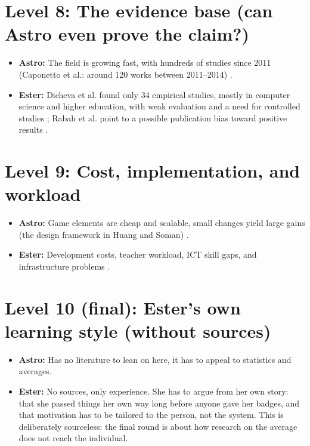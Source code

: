 \documentclass{article}
\begin{document}
\section{Level 8: The evidence base (can Astro even prove the claim?)}
\begin{itemize}
  \item \textbf{Astro:} The field is growing fast, with hundreds of studies since 2011 (Caponetto et al.: around 120 works between 2011--2014) \cite{caponetto2014}.
  \item \textbf{Ester:} Dicheva et al. found only 34 empirical studies, mostly in computer science and higher education, with weak evaluation and a need for controlled studies \cite{dicheva2015}; Rabah et al. point to a possible publication bias toward positive results \cite{rabah2018}.
\end{itemize}

\section{Level 9: Cost, implementation, and workload}
\begin{itemize}
  \item \textbf{Astro:} Game elements are cheap and scalable, small changes yield large gains (the design framework in Huang and Soman) \cite{huang2013}.
  \item \textbf{Ester:} Development costs, teacher workload, ICT skill gaps, and infrastructure problems \cite{mirzaiefeizabadi2022, thorsteinsson2016, slattery2023}.
\end{itemize}

\section{Level 10 (final): Ester's own learning style (without sources)}
\begin{itemize}
  \item \textbf{Astro:} Has no literature to lean on here, it has to appeal to statistics and averages.
  \item \textbf{Ester:} No sources, only experience. She has to argue from her own story: that she passed things her own way long before anyone gave her badges, and that motivation has to be tailored to the person, not the system. This is deliberately sourceless: the final round is about how research on the average does not reach the individual.
\end{itemize}
\end{document}
